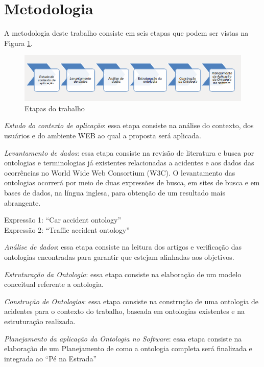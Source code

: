 \section{Metodologia}

A metodologia deste trabalho consiste em seis etapas que podem ser vistas na
Figura \ref{fig:metodologia}.

\graphicspath{{figuras/}}

\begin{figure}[!h]
 \centering
 \includegraphics[scale = 0.75]{metodologia}
 \caption{Etapas do trabalho}
 \label{fig:metodologia}

\end{figure}
\textit{Estudo do contexto de aplicação}: essa etapa consiste na análise do contexto, dos
usuários e do ambiente WEB ao qual a proposta será aplicada.

\textit{Levantamento de dados}: essa etapa consiste na revisão de literatura e busca por
ontologias e terminologias já existentes relacionadas a acidentes e aos dados das
ocorrências no World Wide Web Consortium (W3C). O levantamento das ontologias
ocorrerá por meio de duas expressões de busca, em sites de busca e em bases de dados, na
língua inglesa, para obtenção de um resultado mais abrangente.

\begin{center}
  Expressão 1: “Car accident ontology”\\
  Expressão 2: “Traffic accident ontology”
\end{center}


\textit{Análise de dados}: essa etapa consiste na leitura dos artigos e verificação das
ontologias encontradas para garantir que estejam alinhadas aos objetivos.

\textit{Estruturação da Ontologia}: essa etapa consiste na elaboração de um modelo conceitual
referente a ontologia.

\textit{Construção de Ontologias}: essa etapa consiste na construção de uma ontologia de
acidentes para o contexto do trabalho, baseada em ontologias existentes e na estruturação realizada.

\textit{Planejamento da aplicação da Ontologia no Software}: essa etapa consiste na elaboração de um Planejamento
de como a ontologia completa será finalizada e integrada ao ``Pé na Estrada''

